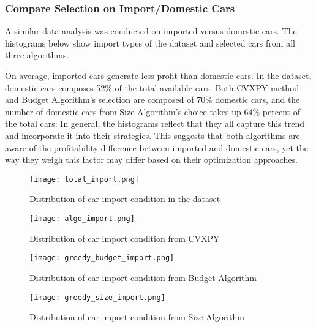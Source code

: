 \documentclass{article}
\begin{document}
\subsubsection{Compare Selection on Import/Domestic Cars}
A similar data analysis was conducted on imported versus domestic cars. The histograms below show import types of the dataset and selected cars from all three algorithms. \par On average, imported cars generate less profit than domestic cars. In the dataset, domestic cars composes 52$\%$ of the total available cars. Both CVXPY method and Budget Algorithm's selection are composed of $70\%$ domestic cars, and the number of domestic cars from Size Algorithm's choice takes up $64\%$ percent of the total cars: In general, the histograms reflect that they all capture this trend and incorporate it into their strategies. This suggests that both algorithms are aware of the profitability difference between imported and domestic cars, yet the way they weigh this factor may differ based on their optimization approaches.
\begin{figure}[h]
    \centering
    \begin{minipage}{0.45\textwidth}
        \centering
        \texttt{[image: total\_import.png]}
        \caption{Distribution of car import condition in the dataset}
        \label{fig:total_import}
    \end{minipage}\hfill
    \begin{minipage}{0.45\textwidth}
        \centering
        \texttt{[image: algo\_import.png]}
        \caption{Distribution of car import condition from CVXPY}
        \label{fig:algo_import}
    \end{minipage}\hfill
    \begin{minipage}{0.45\textwidth}
        \centering
        \texttt{[image: greedy\_budget\_import.png]}
        \caption{Distribution of car import condition from Budget Algorithm}
        \label{fig:greedy_budget_import}
    \end{minipage}\hfill
    \begin{minipage}{0.45\textwidth}
        \centering
        \texttt{[image: greedy\_size\_import.png]}
        \caption{Distribution of car import condition from Size Algorithm}
        \label{fig:greedy_size_import}
    \end{minipage}
\end{figure}
\end{document}
